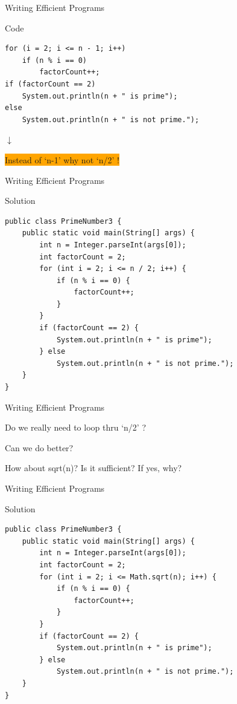 \documentclass[14pt]{beamer}
\begin{document}
\begin{frame}[fragile]{Writing Efficient Programs}
\begin{block}{Code}
\begin{lstlisting}[numbers=none]
for (i = 2; i <= n - 1; i++)  
    if (n % i == 0) 
        factorCount++; 
if (factorCount == 2)
    System.out.println(n + " is prime");
else
    System.out.println(n + " is not prime.");
\end{lstlisting}
\end{block}
\hspace{3cm}$\downarrow$

\vspace{.2pc}
\colorbox{orange}{Instead of `n-1' why not `n/2' ! }
\end{frame}

\begin{frame}[fragile]{Writing Efficient Programs}
 \begin{block}{Solution}
  \begin{lstlisting}[numbers=none]
public class PrimeNumber3 {
    public static void main(String[] args) {
        int n = Integer.parseInt(args[0]);
        int factorCount = 2;
        for (int i = 2; i <= n / 2; i++) {
            if (n % i == 0) {
                factorCount++;
            }
        }
        if (factorCount == 2) {
            System.out.println(n + " is prime");
        } else
            System.out.println(n + " is not prime.");
    }
}
\end{lstlisting}
\end{block}
\end{frame}

\begin{frame}{Writing Efficient Programs}
 \begin{center}
  \begin{minipage}{10cm}
   Do we really need to loop thru  `n/2' ?
   
   \vspace{.5pc}
   Can we do better?
   
   \vspace{.5pc}
   How about sqrt(n)? Is it sufficient? If yes, why? 
  \end{minipage}
 \end{center}
\end{frame}

\begin{frame}[fragile]{Writing Efficient Programs}
 \begin{block}{Solution}
 \begin{lstlisting}[numbers=none]
public class PrimeNumber3 {
    public static void main(String[] args) {
        int n = Integer.parseInt(args[0]);
        int factorCount = 2;
        for (int i = 2; i <= Math.sqrt(n); i++) {
            if (n % i == 0) {
                factorCount++;
            }
        }
        if (factorCount == 2) {
            System.out.println(n + " is prime");
        } else 
            System.out.println(n + " is not prime.");
    }
}
\end{lstlisting}
\end{block}
\end{frame}
\end{document}
